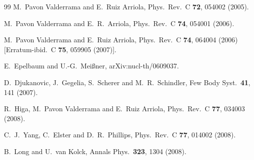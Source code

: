 \documentclass[aps,rmp,nofootinbib,twocolumn,floatfix]{revtex4}
\begin{document}
\begin{thebibliography}{99}
  M.~Pavon Valderrama and E.~Ruiz Arriola,
  Phys.\ Rev.\  C {\bf 72}, 054002 (2005).

  M.~Pavon Valderrama and E.~R.~Arriola,
  Phys.\ Rev.\  C {\bf 74}, 054001 (2006).

  M.~Pavon Valderrama and E.~Ruiz Arriola,
  Phys.\ Rev.\  C {\bf 74}, 064004 (2006)
  [Erratum-ibid.\  C {\bf 75}, 059905 (2007)].

  E.~Epelbaum and U.-G.~Mei{\ss}ner,
  arXiv:nucl-th/0609037.

  D.~Djukanovic, J.~Gegelia, S.~Scherer and M.~R.~Schindler,
  Few Body Syst.\  {\bf 41}, 141 (2007).

  R.~Higa, M.~Pavon Valderrama and E.~Ruiz Arriola,
  Phys.\ Rev.\  C {\bf 77}, 034003 (2008).

  C.~J.~Yang, C.~Elster and D.~R.~Phillips,
  Phys.\ Rev.\  C {\bf 77}, 014002 (2008).

  B.~Long and U.~van Kolck,
  Annals Phys.\  {\bf 323}, 1304 (2008).


\end{thebibliography}
\end{document}
